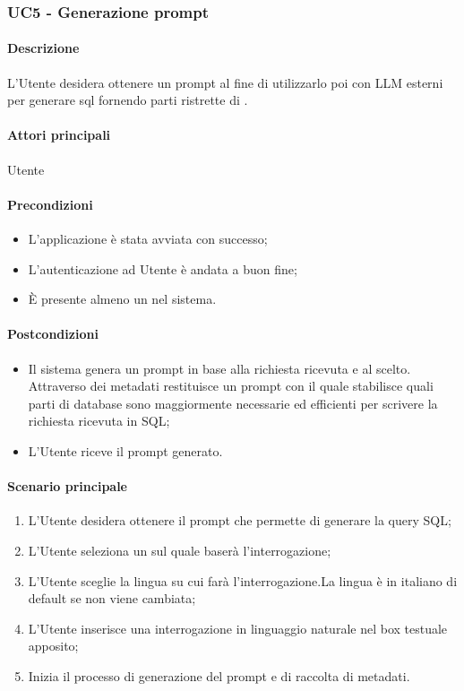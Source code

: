 \subsubsection{UC5 - Generazione prompt}\label{UC5}
\paragraph*{Descrizione}
L’Utente desidera ottenere un prompt al fine di utilizzarlo poi con LLM esterni per generare  sql fornendo parti ristrette di .

\paragraph*{Attori principali} Utente

\paragraph*{Precondizioni}
\begin{itemize}
  \item L'applicazione è stata avviata con successo;
  \item L’autenticazione ad Utente è andata a buon fine;
  \item È presente almeno un  nel sistema.
\end{itemize}

\paragraph*{Postcondizioni}
\begin{itemize}
  \item Il sistema genera un prompt in base alla richiesta ricevuta e al  scelto. Attraverso dei metadati restituisce un prompt con il quale stabilisce quali parti di database sono maggiormente necessarie ed efficienti per scrivere la richiesta ricevuta in SQL;
  \item L’Utente riceve il prompt generato.
\end{itemize}

\paragraph*{Scenario principale}
\begin{enumerate}
  \item L’Utente desidera ottenere il prompt che permette di generare la query SQL;
  \item L’Utente seleziona un  sul quale baserà l’interrogazione;
  \item L’Utente sceglie la lingua su cui farà l’interrogazione.La lingua è in italiano di default se non viene cambiata;
  \item L’Utente inserisce una interrogazione in linguaggio naturale nel box testuale apposito;
  \item Inizia il processo di generazione del prompt e di raccolta di metadati.
\end{enumerate}

